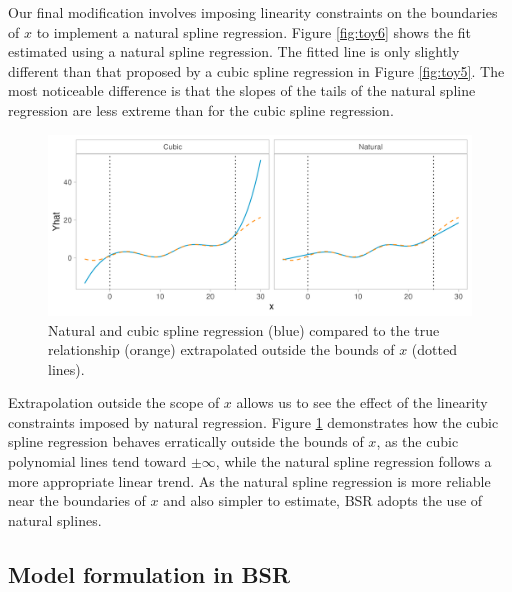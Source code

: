 \documentclass[12pt, twoside]{amherstthesis}
\begin{document}
Our final modification involves imposing linearity constraints on the boundaries of \(x\) to implement a natural spline regression. Figure \ref{fig:toy6} shows the fit estimated using a natural spline regression. The fitted line is only slightly different than that proposed by a cubic spline regression in Figure \ref{fig:toy5}. The most noticeable difference is that the slopes of the tails of the natural spline regression are less extreme than for the cubic spline regression.
\begin{figure}

{\centering \includegraphics[width=1\linewidth]{figures/ch3_toybounds} 

}

\caption{Natural and cubic spline regression (blue) compared to the true relationship (orange) extrapolated outside the bounds of $x$ (dotted lines).}\label{fig:toybounds}
\end{figure}
Extrapolation outside the scope of \(x\) allows us to see the effect of the linearity constraints imposed by natural regression. Figure \ref{fig:toybounds} demonstrates how the cubic spline regression behaves erratically outside the bounds of \(x\), as the cubic polynomial lines tend toward \(\pm\infty\), while the natural spline regression follows a more appropriate linear trend. As the natural spline regression is more reliable near the boundaries of \(x\) and also simpler to estimate, BSR adopts the use of natural splines.

\hypertarget{model-formulation-in-bsr}{%
\subsection{Model formulation in BSR}\label{model-formulation-in-bsr}}
\end{document}
